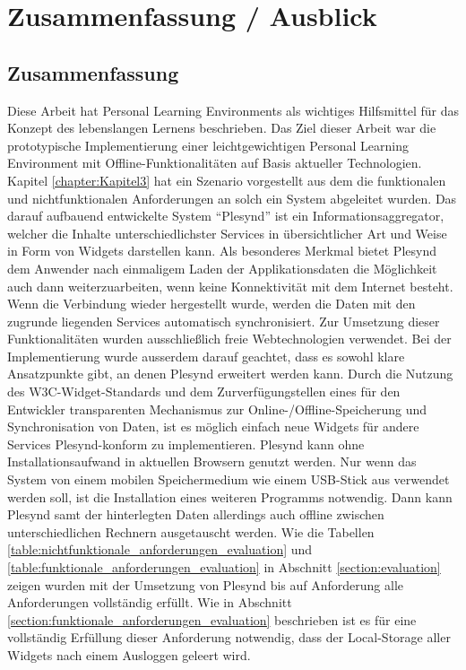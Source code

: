 \chapter{Zusammenfassung / Ausblick} 
\label{chapter:Kapitel7}

\section{Zusammenfassung}
Diese Arbeit hat Personal Learning Environments als wichtiges Hilfsmittel für das Konzept des lebenslangen Lernens beschrieben. Das Ziel dieser Arbeit war die prototypische Implementierung einer leichtgewichtigen Personal Learning Environment mit Offline-Funktionalitäten auf Basis aktueller Technologien. Kapitel \ref{chapter:Kapitel3} hat ein Szenario vorgestellt aus dem die funktionalen und nichtfunktionalen Anforderungen an solch ein System abgeleitet wurden. Das darauf aufbauend entwickelte System "`Plesynd"' ist ein Informationsaggregator, welcher die Inhalte unterschiedlichster Services in übersichtlicher Art und Weise in Form von Widgets darstellen kann. Als besonderes Merkmal bietet Plesynd dem Anwender nach einmaligem Laden der Applikationsdaten die Möglichkeit auch dann weiterzuarbeiten, wenn keine Konnektivität mit dem Internet besteht. Wenn die Verbindung wieder hergestellt wurde, werden die Daten mit den zugrunde liegenden Services automatisch synchronisiert. Zur Umsetzung dieser Funktionalitäten wurden ausschließlich freie Webtechnologien verwendet. Bei der Implementierung wurde ausserdem darauf geachtet, dass es sowohl klare Ansatzpunkte gibt, an denen Plesynd erweitert werden kann. Durch die Nutzung des W3C-Widget-Standards und dem Zurverfügungstellen eines für den Entwickler transparenten Mechanismus zur Online-/Offline-Speicherung und Synchronisation von Daten, ist es möglich einfach neue Widgets für andere Services Plesynd-konform zu implementieren. Plesynd kann ohne Installationsaufwand in aktuellen Browsern genutzt werden. Nur wenn das System von einem mobilen Speichermedium wie einem USB-Stick aus verwendet werden soll, ist die Installation eines weiteren Programms notwendig. Dann kann Plesynd samt der hinterlegten Daten allerdings auch offline zwischen unterschiedlichen Rechnern ausgetauscht werden.  Wie die Tabellen \ref{table:nichtfunktionale_anforderungen_evaluation} und \ref{table:funktionale_anforderungen_evaluation} in Abschnitt \ref{section:evaluation} zeigen wurden mit der Umsetzung von Plesynd bis auf Anforderung  alle Anforderungen vollständig erfüllt. Wie in Abschnitt \ref{section:funktionale_anforderungen_evaluation} beschrieben ist es für eine vollständig Erfüllung dieser Anforderung notwendig, dass der Local-Storage aller Widgets nach einem Ausloggen geleert wird. 

